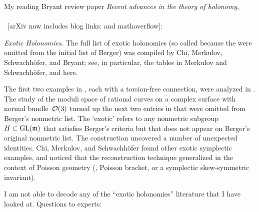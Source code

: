 \medskip

My reading Bryant review paper
{\em Recent advances in the theory of holonomy},
\\ 
\\~[arXiv now includes blog links:
and
{mathoverflow}]:


{\it Exotic Holonomies.}
The full list of exotic holonomies (so called because the were omitted from
the initial list of Berger) was compiled by Chi, Merkulov,
Schwachh\"ofer, and Bryant; see, in
particular, the tables in Merkulov and
Schwachh{\"o}fer, and  here.

The first two examples in , each with a torsion-free
connection, were analyzed in . The
study of the moduli space of rational curves on a
complex surface with normal bundle~${\cal O}(3)$ turned up the next two
entries in  that were omitted from Berger's nonmetric
list. The `exotic' refers to any nonmetric
subgroup~$H\subset{\rm GL}({\mathfrak m})$ that satisfies Berger's criteria but
that does not appear on Berger's original nonmetric list.
The construction  uncovered a number of unexpected identities.
Chi, Merkulov, and Schwachh\"ofer found other exotic symplectic
examples, and noticed that the reconstruction technique generalized in the
context of Poisson geometry (\ie, Poisson bracket, or a symplectic
skew-symmetric invariant).


\bigskip

I am not able to decode any of the ``exotic holonomies'' literature that I
have looked at. Questions to experts:

